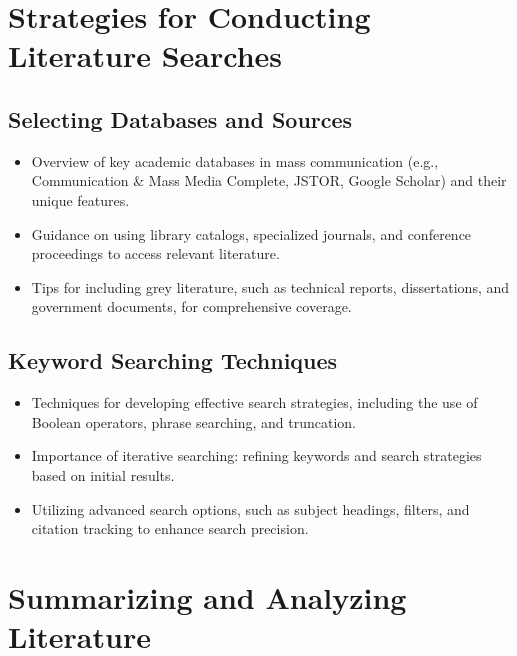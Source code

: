\documentclass[
]{book}
\begin{document}
\hypertarget{strategies-for-conducting-literature-searches}{%
\section*{Strategies for Conducting Literature Searches}\label{strategies-for-conducting-literature-searches}}

\hypertarget{selecting-databases-and-sources}{%
\subsection*{Selecting Databases and Sources}\label{selecting-databases-and-sources}}

\begin{itemize}
\item
  Overview of key academic databases in mass communication (e.g., Communication \& Mass Media Complete, JSTOR, Google Scholar) and their unique features.
\item
  Guidance on using library catalogs, specialized journals, and conference proceedings to access relevant literature.
\item
  Tips for including grey literature, such as technical reports, dissertations, and government documents, for comprehensive coverage.
\end{itemize}

\hypertarget{keyword-searching-techniques}{%
\subsection*{Keyword Searching Techniques}\label{keyword-searching-techniques}}

\begin{itemize}
\item
  Techniques for developing effective search strategies, including the use of Boolean operators, phrase searching, and truncation.
\item
  Importance of iterative searching: refining keywords and search strategies based on initial results.
\item
  Utilizing advanced search options, such as subject headings, filters, and citation tracking to enhance search precision.
\end{itemize}

\hypertarget{summarizing-and-analyzing-literature}{%
\section*{Summarizing and Analyzing Literature}\label{summarizing-and-analyzing-literature}}
\end{document}
